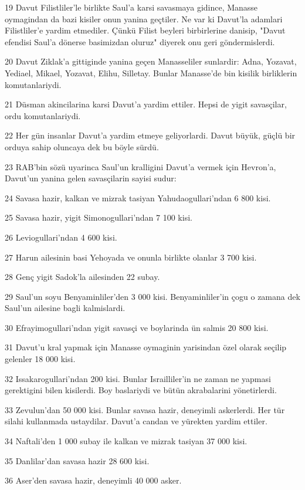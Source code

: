 \par 19 Davut Filistliler'le birlikte Saul'a karsi savasmaya gidince, Manasse oymagindan da bazi kisiler onun yanina geçtiler. Ne var ki Davut'la adamlari Filistliler'e yardim etmediler. Çünkü Filist beyleri birbirlerine danisip, "Davut efendisi Saul'a dönerse basimizdan oluruz" diyerek onu geri göndermislerdi.
\par 20 Davut Ziklak'a gittiginde yanina geçen Manasseliler sunlardir: Adna, Yozavat, Yediael, Mikael, Yozavat, Elihu, Silletay. Bunlar Manasse'de bin kisilik birliklerin komutanlariydi.
\par 21 Düsman akincilarina karsi Davut'a yardim ettiler. Hepsi de yigit savasçilar, ordu komutanlariydi.
\par 22 Her gün insanlar Davut'a yardim etmeye geliyorlardi. Davut büyük, güçlü bir orduya sahip oluncaya dek bu böyle sürdü.
\par 23 RAB'bin sözü uyarinca Saul'un kralligini Davut'a vermek için Hevron'a, Davut'un yanina gelen savasçilarin sayisi sudur:
\par 24 Savasa hazir, kalkan ve mizrak tasiyan Yahudaogullari'ndan 6 800 kisi.
\par 25 Savasa hazir, yigit Simonogullari'ndan 7 100 kisi.
\par 26 Leviogullari'ndan 4 600 kisi.
\par 27 Harun ailesinin basi Yehoyada ve onunla birlikte olanlar 3 700 kisi.
\par 28 Genç yigit Sadok'la ailesinden 22 subay.
\par 29 Saul'un soyu Benyaminliler'den 3 000 kisi. Benyaminliler'in çogu o zamana dek Saul'un ailesine bagli kalmislardi.
\par 30 Efrayimogullari'ndan yigit savasçi ve boylarinda ün salmis 20 800 kisi.
\par 31 Davut'u kral yapmak için Manasse oymaginin yarisindan özel olarak seçilip gelenler 18 000 kisi.
\par 32 Issakarogullari'ndan 200 kisi. Bunlar Israilliler'in ne zaman ne yapmasi gerektigini bilen kisilerdi. Boy baslariydi ve bütün akrabalarini yönetirlerdi.
\par 33 Zevulun'dan 50 000 kisi. Bunlar savasa hazir, deneyimli askerlerdi. Her tür silahi kullanmada ustaydilar. Davut'a candan ve yürekten yardim ettiler.
\par 34 Naftali'den 1 000 subay ile kalkan ve mizrak tasiyan 37 000 kisi.
\par 35 Danlilar'dan savasa hazir 28 600 kisi.
\par 36 Aser'den savasa hazir, deneyimli 40 000 asker.
